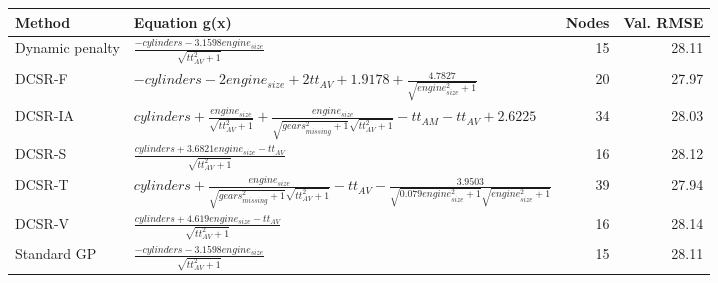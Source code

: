 \begin{tabular}{lp{9cm}rr}
\toprule
Method & Equation g(x) & Nodes & Val. RMSE \\
\midrule
Dynamic penalty & $\frac{- cylinders - 3.1598 engine_{size}}{\sqrt{tt_{AV}^{2} + 1}}$ & 15 & 28.11 \\
DCSR-F & $- cylinders - 2 engine_{size} + 2 tt_{AV} + 1.9178 + \frac{4.7827}{\sqrt{engine_{size}^{2} + 1}}$ & 20 & 27.97 \\
DCSR-IA & $cylinders + \frac{engine_{size}}{\sqrt{tt_{AV}^{2} + 1}} + \frac{engine_{size}}{\sqrt{gears_{missing}^{2} + 1} \sqrt{tt_{AV}^{2} + 1}} - tt_{AM} - tt_{AV} + 2.6225$ & 34 & 28.03 \\
DCSR-S & $\frac{cylinders + 3.6821 engine_{size} - tt_{AV}}{\sqrt{tt_{AV}^{2} + 1}}$ & 16 & 28.12 \\
DCSR-T & $cylinders + \frac{engine_{size}}{\sqrt{gears_{missing}^{2} + 1} \sqrt{tt_{AV}^{2} + 1}} - tt_{AV} - \frac{3.9503}{\sqrt{0.079 engine_{size}^{2} + 1} \sqrt{engine_{size}^{2} + 1}}$ & 39 & 27.94 \\
DCSR-V & $\frac{cylinders + 4.619 engine_{size} - tt_{AV}}{\sqrt{tt_{AV}^{2} + 1}}$ & 16 & 28.14 \\
Standard GP & $\frac{- cylinders - 3.1598 engine_{size}}{\sqrt{tt_{AV}^{2} + 1}}$ & 15 & 28.11 \\
\bottomrule
\end{tabular}
